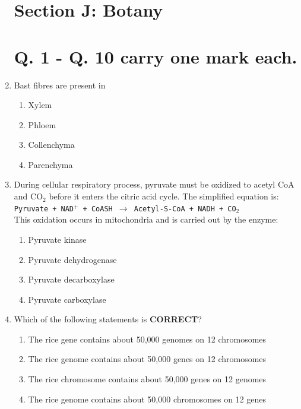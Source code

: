 \documentclass[journal]{IEEEtran}
\begin{document}
\begin{enumerate}
\clearpage
\section*{Section J: Botany}

\section*{Q. 1 - Q. 10 carry one mark each.}

\item Bast fibres are present in\hfill  \textit{}
\begin{enumerate}
    \item Xylem
    \item Phloem
    \item Collenchyma
    \item Parenchyma
\end{enumerate}

\item During cellular respiratory process, pyruvate must be oxidized to acetyl CoA and CO$_2$ before it enters the citric acid cycle. The simplified equation is: \\
\texttt{Pyruvate + NAD$^+$ + CoASH $\rightarrow$ Acetyl-S-CoA + NADH + CO$_2$} \\
This oxidation occurs in mitochondria and is carried out by the enzyme:\hfill  \textit{}
\begin{enumerate}
    \item Pyruvate kinase
    \item Pyruvate dehydrogenase
    \item Pyruvate decarboxylase
    \item Pyruvate carboxylase
\end{enumerate}

\item Which of the following statements is \textbf{CORRECT}?\hfill  \textit{}
\begin{enumerate}
    \item The rice gene contains about 50,000 genomes on 12 chromosomes
    \item The rice genome contains about 50,000 genes on 12 chromosomes
    \item The rice chromosome contains about 50,000 genes on 12 genomes
    \item The rice genome contains about 50,000 chromosomes on 12 genes
\end{enumerate}


\end{enumerate}
\end{document}
